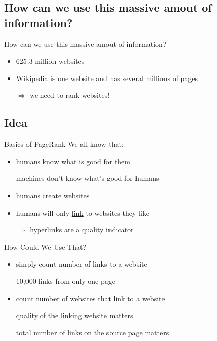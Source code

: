 \subsection{How can we use this massive amout of information?}
\begin{frame}{How can we use this massive amout of information?}
    \begin{itemize}[<+->]
        \item 625.3 million websites
        \item Wikipedia is one website and has several millions of pages
        \item[$\Rightarrow$] we need to rank websites!
    \end{itemize}
\end{frame}

\subsection{Idea}
\begin{frame}{Basics of PageRank}
    We all know that:
    \begin{itemize}[<+->]
        \item humans know what is good for them
        \item[\xmark] machines don't know what's good for humans
        \item humans create websites
        \item humans will only \href{http://en.wikipedia.org/wiki/Hyperlink}{link} to websites they like
        \item[$\Rightarrow$] hyperlinks are a quality indicator
    \end{itemize}
\end{frame}

\begin{frame}{How Could We Use That?}
    \begin{itemize}[<+->]
        \item simply count number of links to a website
        \item[\xmark] 10,000 links from only one page
        \item count number of websites that link to a website
        \item[\xmark] quality of the linking website matters
        \item[\xmark] total number of links on the source page matters
    \end{itemize}
\end{frame}

